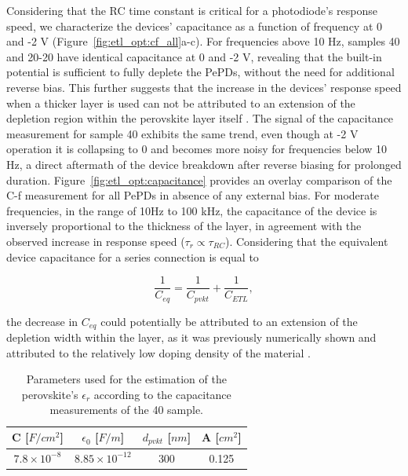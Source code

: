 Considering that the RC time constant is critical for a photodiode's response speed, we characterize the devices' capacitance as a function of frequency at 0 and -2 V (Figure~\ref{fig:etl_opt:cf_all}a-c). For frequencies above 10 Hz, samples 40 and 20-20 have identical capacitance at 0 and -2 V, revealing that the built-in potential is sufficient to fully deplete the PePDs, without the need for additional reverse bias. This further suggests that the increase in the devices' response speed when a thicker  layer is used can not be attributed to an extension of the depletion region within the perovskite layer itself \cite{Goushcha2017OnPhotodiodes}. The signal of the capacitance measurement for sample 40 exhibits the same trend, even though at -2 V operation it is collapsing to 0 and becomes more noisy for frequencies below 10 Hz, a direct aftermath of the device breakdown after reverse biasing for prolonged duration. Figure~\ref{fig:etl_opt:capacitance} provides an overlay comparison of the C-f measurement for all PePDs in absence of any external bias. For moderate frequencies, in the range of 10Hz to 100 kHz, the capacitance of the device is inversely proportional to the thickness of the  layer, in agreement with the observed increase in response speed ($\tau_r \propto \tau_{RC}$). Considering that the equivalent device capacitance for a series connection is equal to 
 
 \begin{equation}
    \frac{1}{C_{eq}} = \frac{1}{C_{pvkt}} + \frac{1}{C_{ETL}},
    \label{eg:series_cap}
 \end{equation}

 the decrease in $C_{eq}$ could potentially be attributed to an extension of the depletion width within the  layer, as it was previously numerically shown and attributed to the relatively low doping density of the material \cite{Pham2023EffectsCells}.  

\begin{table}[htbp]
    \centering
    \caption{Parameters used for the estimation of the perovskite’s $\epsilon_r$ according to the capacitance measurements of the 40 sample. }
    \renewcommand{\arraystretch}{1.5}
    \begin{tabular}{| c | c | c | c |}
        \hline
        C [$F/cm^2$] & $\epsilon_0$ [$F/m$] & $d_{pvkt}$ [$nm$] & A [$cm^2$] \\
        \hline
        $7.8\times10^{-8}$ & $8.85\times10^{-12}$ & 300 & 0.125 \\
        \hline
    \end{tabular}
    
    \label{tab:etl_opt:er_from_pepd}
\end{table}

